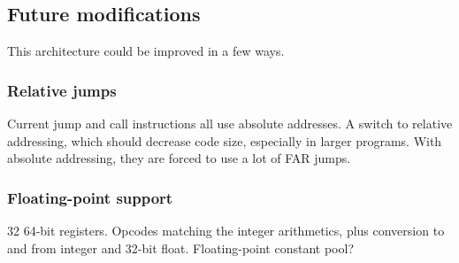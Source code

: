 \documentclass {article}
\begin{document}
\subsection{Future modifications}

This architecture could be improved in a few ways.

\subsubsection{Relative jumps}

Current jump and call instructions all use absolute addresses. A switch to relative addressing,
which should decrease code size, especially in larger programs. With absolute addressing,
they are forced to use a lot of FAR jumps.

\subsubsection{Floating-point support}

32 64-bit registers. Opcodes matching the integer arithmetics,
plus conversion to and from integer and 32-bit float.
Floating-point constant pool?
\end{document}
